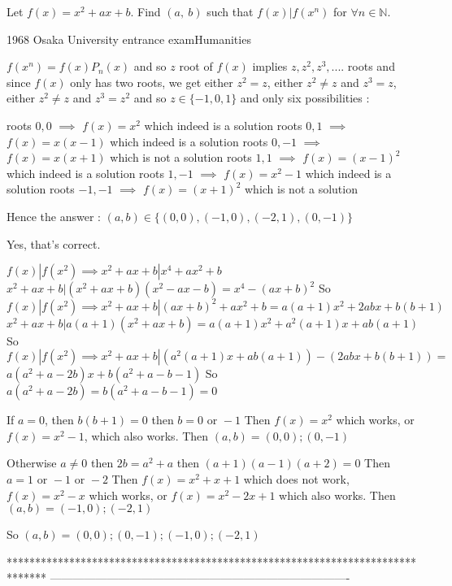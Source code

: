 \begin{solution}
	\begin{tcolorbox}Let $f(x)=x^2+ax+b$. Find $(a,\ b)$ such that $f(x)|f(x^n)$ for $\forall n\in{\mathbb{N}}.$

\begin{italicized}1968 Osaka University entrance exam\/Humanities\end{italicized}\end{tcolorbox}

$f(x^n)=f(x)P_n(x)$ and so $z$ root of $f(x)$ implies $z,z^2,z^3,....$ roots and since $f(x)$ only has two roots, we get either $z^2=z$, either $z^2\ne z$ and $z^3=z$, either $z^2\ne z$ and $z^3=z^2$ and so $z\in\{-1,0,1\}$ and only six possibilities :

roots $0,0$ $\implies$ $f(x)=x^2$ which indeed is a solution
roots $0,1$ $\implies$ $f(x)=x(x-1)$ which indeed is a solution
roots $0,-1$ $\implies$ $f(x)=x(x+1)$ which is not a solution
roots $1,1$ $\implies$ $f(x)=(x-1)^2$ which indeed is a solution
roots $1,-1$ $\implies$ $f(x)=x^2-1$ which indeed is a solution
roots $-1,-1$ $\implies$ $f(x)=(x+1)^2$ which is not a solution

Hence the answer : $\boxed{(a,b)\in\{(0,0),(-1,0),(-2,1),(0,-1)\}}$
\end{solution}



\begin{solution}
	Yes, that's correct.
\end{solution}



\begin{solution}
	$f(x)|f(x^2)\implies x^2+ax+b|x^4+ax^2+b$
$x^2+ax+b|(x^2+ax+b)(x^2-ax-b)=x^4-(ax+b)^2$
So $f(x)|f(x^2)\implies x^2+ax+b|(ax+b)^2+ax^2+b=a(a+1)x^2+2abx+b(b+1)$
$x^2+ax+b|a(a+1)(x^2+ax+b)=a(a+1)x^2+a^2(a+1)x+ab(a+1)$
So $f(x)|f(x^2)\implies x^2+ax+b|(a^2(a+1)x+ab(a+1))-(2abx+b(b+1))=$ $a(a^2+a-2b)x+b(a^2+a-b-1)$
So $a(a^2+a-2b)=b(a^2+a-b-1)=0$

If $a=0$, then $b(b+1)=0$ then $b=0\text{ or }-1$
Then $f(x)=x^2$ which works, or $f(x)=x^2-1$, which also works.
Then $(a, b)=(0,0); (0,-1)$

Otherwise $a\neq 0$ then $2b=a^2+a$ then $(a+1)(a-1)(a+2)=0$
Then $a=1\text{ or } -1\text{ or } -2$
Then $f(x)=x^2+x+1$ which does not work, $f(x)=x^2-x$ which works, or $f(x)=x^2-2x+1$ which also works.
Then $(a, b)=(-1, 0); (-2, 1)$

So $(a, b)=(0,0); (0,-1); (-1, 0); (-2, 1)$
\end{solution}
*******************************************************************************
-------------------------------------------------------------------------------

